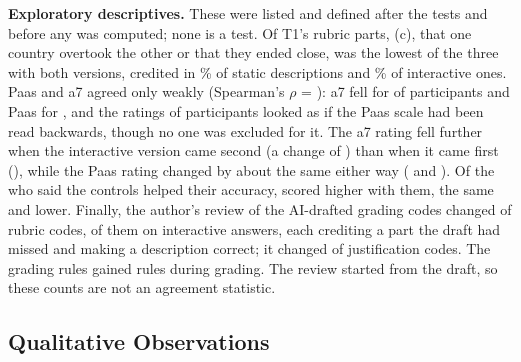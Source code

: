 \documentclass[10pt,twocolumn]{article}
\begin{document}
\textbf{Exploratory descriptives.} These were listed and defined after the tests and before any was computed; none is a test. Of T1's rubric parts, (c), that one country overtook the other or that they ended close, was the lowest of the three with both versions, credited in \% of static descriptions and \% of interactive ones. Paas and a7 agreed only weakly (Spearman's $\rho$ = ): a7 fell for  of  participants and Paas for , and the ratings of  participants looked as if the Paas scale had been read backwards, though no one was excluded for it. The a7 rating fell further when the interactive version came second (a change of ) than when it came first (), while the Paas rating changed by about the same either way ( and ). Of the  who said the controls helped their accuracy,  scored higher with them,  the same and  lower. Finally, the author's review of the AI-drafted grading codes changed  of  rubric codes,  of them on interactive answers, each crediting a part the draft had missed and making a description correct; it changed  of  justification codes. The grading rules gained  rules during grading. The review started from the draft, so these counts are not an agreement statistic.

\begin{table}[t]
    \centering
    \footnotesize
    
    \caption{
        The survey, main analysis; Appendix~\ref{app:preregistered} gives it as pre-registered. Mean agreement (SD) with each statement after each version, the statements about the controls after the interactive version only, and how many participants chose each answer to the two questions asked after the second version. Descriptive.
    }
    \label{tab:survey}
\end{table}

\subsection{Qualitative Observations}
\label{sec:qualitative}
\end{document}
